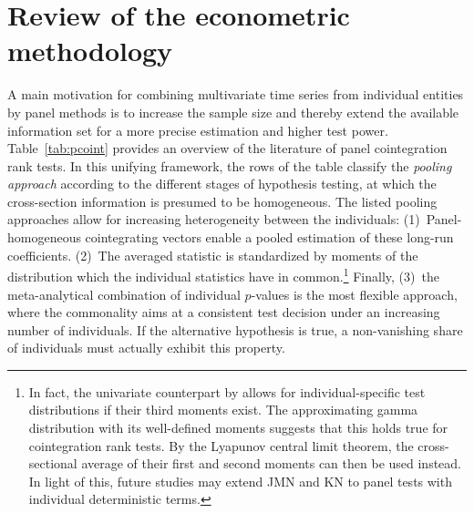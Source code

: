  
\section{Review of the econometric methodology} \label{sec:Review}
A main motivation for combining multivariate time series from individual entities by panel methods is to increase the sample size and thereby extend the available information set for a more precise estimation and higher test power.
Table~\ref{tab:pcoint} provides an overview of the literature of panel cointegration rank tests. In this unifying framework, the rows of the table classify the \textit{pooling approach} according to the different stages of hypothesis testing, at which the cross-section information is presumed to be homogeneous. The listed pooling approaches allow for increasing heterogeneity between the individuals: (1)~Panel-homogeneous cointegrating vectors enable a pooled estimation of these long-run coefficients. (2)~The averaged statistic is standardized by moments of the distribution which the individual statistics have in common.\footnote{In fact, the univariate counterpart by \citet[p.~59, Remark~3.1]{ImPesaranShin2003} allows for individual-specific test distributions if their third moments exist. The approximating gamma distribution with its well-defined moments suggests that this holds true for cointegration rank tests. By the Lyapunov central limit theorem, the cross-sectional average of their first and second moments can then be used instead. In light of this, future studies may extend JMN \citeyearpar{JohansenEtAl2000} and KN \citeyearpar{KuritaNielsen2019} to panel tests with individual deterministic terms.} Finally, (3)~the meta-analytical combination of individual $p$-values is the most flexible approach, where the commonality aims at a consistent test decision under an increasing number of individuals. If the alternative hypothesis is true, a non-vanishing share of individuals must actually exhibit this property.

\begin{table}[ht]	%
	\centering
	\caption{Panel tests for the rank of cointegration.}
	\resizebox{\textwidth}{!}{ 
		}
	\label{tab:pcoint}		
\end{table}


